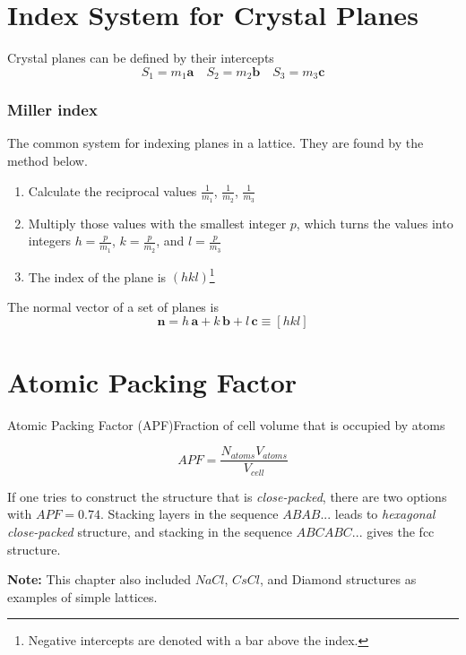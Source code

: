 \section{Index System for Crystal Planes}
Crystal planes can be defined by their intercepts
\begin{equation*}
    S_1 = m_1 \mathbf{a} \quad S_2 = m_2 \mathbf{b} \quad S_3 = m_3 \mathbf{c}
\end{equation*}

\subsubsection{Miller index}
The common system for indexing planes in a lattice. They are found by the method below.
\begin{enumerate}
    \item Calculate the reciprocal values $\frac{1}{m_1}$, $\frac{1}{m_2}$, $\frac{1}{m_3}$
    \item Multiply those values with the smallest integer $p$, which turns the values into integers $h=\frac{p}{m_1}$, $k=\frac{p}{m_2}$, and $l=\frac{p}{m_3}$
    \item The index of the plane is $(hkl)$\footnote{Negative intercepts are denoted with a bar above the index.}
\end{enumerate}

The normal vector of a set of planes is
\begin{equation*}
    \mathbf{n} = h \, \mathbf{a} + k \, \mathbf{b} + l \, \mathbf{c} \equiv [hkl]
\end{equation*}



\section{Atomic Packing Factor}
\begin{definition}
{Atomic Packing Factor (APF)}{Fraction of cell volume that is occupied by atoms}
\end{definition}
\begin{equation}
    APF = \frac{N_{atoms}V_{atoms}}{V_{cell}}
\end{equation}

If one tries to construct the structure that is \emph{close-packed}, there are two options with $APF=0.74$. Stacking layers in the sequence $ABAB...$ leads to \emph{hexagonal close-packed} structure, and stacking in the sequence $ABCABC...$ gives the fcc structure.

\vspace{10pt}
\textbf{Note:} This chapter also included $NaCl$, $CsCl$, and Diamond structures as examples of simple lattices.
